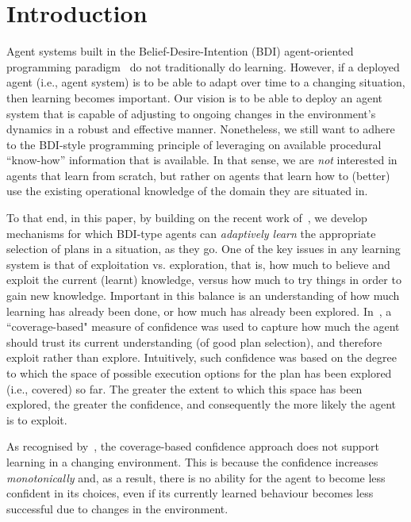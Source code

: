 \section{Introduction}\label{sec:introduction}

Agent systems built in the Belief-Desire-Intention (BDI) agent-oriented programming paradigm~\cite{Georgeff89-PRS,Rao96:AgentSpeak,WooldridgeBook} do not traditionally do learning. 
However, if a deployed agent (i.e., agent system) is to be able to adapt over time to a changing situation, then learning becomes important. Our vision is to be able to deploy an agent system that is capable of adjusting to ongoing changes in the environment's dynamics in a robust and effective manner. Nonetheless, we still want to adhere to the BDI-style programming principle of leveraging on available procedural ``know-how'' information that is available. In that sense, we are \emph{not} interested in agents that learn from scratch, but rather on agents that learn how to (better) use the existing operational knowledge of the domain they are situated in. 



To that end, in this paper, by building on the recent work of~\cite{airiau09:enhancing,singh10:extending,singh10:learning}, we develop mechanisms for which BDI-type agents can \emph{adaptively learn} the appropriate selection of plans in a situation, as they go. 
One of the key issues in any learning system is that of exploitation vs. exploration, that is, how much to believe and exploit the current (learnt) knowledge, versus how much to try things in order to gain new knowledge. Important in this balance is an understanding of how much learning has already been done, or how much has already been explored. In~\cite{singh10:extending,singh10:learning}, a ``coverage-based" measure of confidence was used to capture how much the agent should trust its current understanding (of good plan selection), and therefore exploit rather than explore. Intuitively, such confidence was based on the degree to which the space of possible execution options for the plan has been explored (i.e., covered) so far. The greater the extent to which this space has been explored, the greater the confidence, and consequently the more likely the agent is to exploit.  

As recognised by~\cite{singh10:learning}, the coverage-based confidence approach does not support learning in a changing environment. This is because the confidence increases \emph{monotonically} and, as a result, there is no ability for the agent to become less confident in its choices, even if its currently learned behaviour becomes less successful due to changes in the environment.



